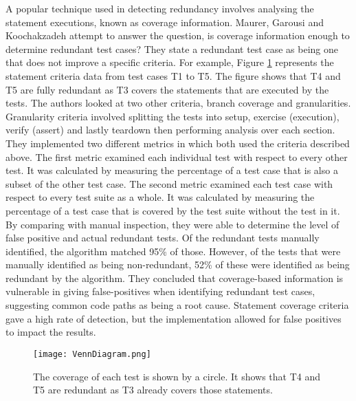 A popular technique used in detecting redundancy involves analysing the statement executions, known as coverage information. Maurer, Garousi and Koochakzadeh \cite{koochakzadeh2009test} attempt to answer the question, is coverage information enough to determine redundant test cases? They state a redundant test case as being one that does not improve a specific criteria. For example, Figure \ref{fig:venndiagram} represents the statement criteria data from test cases T1 to T5. The figure shows that T4 and T5 are fully redundant as T3 covers the statements that are executed by the tests. The authors looked at two other criteria, branch coverage and granularities. Granularity criteria involved splitting the tests into setup, exercise (execution), verify (assert) and lastly teardown then performing analysis over each section. They implemented two different metrics in which both used the criteria described above. The first metric examined each individual test with respect to every other test. It was calculated by measuring the percentage of a test case that is also a subset of the other test case. The second metric examined each test case with respect to every test suite as a whole. It was calculated by measuring the percentage of a test case that is covered by the test suite without the test in it. By comparing with manual inspection, they were able to determine the level of false positive and actual redundant tests. Of the redundant tests manually identified, the algorithm matched 95\% of those. However, of the tests that were manually identified as being non-redundant, 52\% of these were identified as being redundant by the algorithm. They concluded that coverage-based information is vulnerable in giving false-positives when identifying redundant test cases, suggesting common code paths as being a root cause. Statement coverage criteria gave a high rate of detection, but the implementation allowed for false positives to impact the results. 

\begin{figure}[h]
\begin{center}
\texttt{[image: VennDiagram.png]}
\end{center}
\caption{The coverage of each test is shown by a circle. It shows that T4 and T5 are redundant as T3 already covers those statements.}
\label{fig:venndiagram}
\end{figure}

